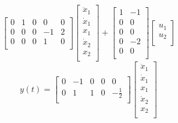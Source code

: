\documentclass{article}
\begin{document}
\begin{enumerate}[(a)]
$$\begin{bmatrix}
0 & 1 & 0 & 0 & 0 \\
0 & 0 & 0 & -1 & 2 \\
0 & 0 & 0 & 1 & 0 \\
\end{bmatrix}
\begin{bmatrix}
\ddot{x}_1 \\
\dot{x}_1 \\
x_1 \\
\dot{x}_2 \\
x_2 \\
\end{bmatrix}
+
\begin{bmatrix}
1 & -1 \\
0 & 0 \\
0 & 0 \\
0 & -2 \\
0 & 0 \\
\end{bmatrix}
\begin{bmatrix}
u_1 \\
u_2 \\
\end{bmatrix}
$$
$$
y(t) =
\begin{bmatrix}
0 & -1 & 0 & 0 & 0 \\
0 & 1 & 1 & 0 & -\frac{1}{2} \\
\end{bmatrix}
\begin{bmatrix}
\ddot{x}_1 \\
\dot{x}_1 \\
x_1 \\
\dot{x}_2 \\
x_2 \\
\end{bmatrix}
$$


\end{enumerate}
\end{document}
